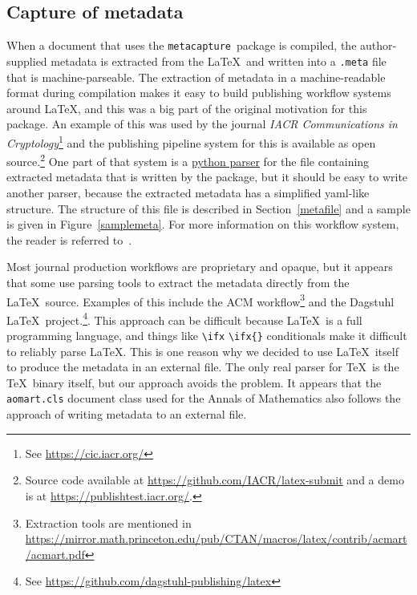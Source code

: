 \documentclass{article}
\newcommand{\pkgname}{\texttt{metacapture}}
\newcommand{\cmd}[2][]{%
  \def\FirstArg{#1}%
  \ifx\FirstArg\empty%
    \texttt{\textbackslash{}#2}%
  \else%
    \texttt{\textbackslash{}#2\{#1\}}%
  \fi
}
\begin{document}
\subsection{Capture of metadata}
When a document that uses the \pkgname\ package is compiled, the
author-supplied metadata is extracted from the \LaTeX\ and written
into a \texttt{.meta} file that is machine-parseable. The extraction
of metadata in a machine-readable format during compilation makes it
easy to build publishing workflow systems around \LaTeX, and this was
a big part of the original motivation for this package. An example of
this was used by the journal {\em IACR Communications in
Cryptology}\footnote{See \url{https://cic.iacr.org/}} and the publishing
pipeline system for this is available as open source.\footnote{Source code available
at \url{https://github.com/IACR/latex-submit} and a demo is
at \url{https://publishtest.iacr.org/}.} One part of that system is
a \href{https://github.com/IACR/latex/tree/main/iacrcc/parser}{python
parser} for the file containing extracted metadata that is written by
the package, but it should be easy to write another parser, because
the extracted metadata has a simplified yaml-like structure. The
structure of this file is described in Section~\ref{metafile} and a
sample is given in Figure~\ref{samplemeta}. For more information on
this workflow system, the reader is referred to~\cite{loweringthecost}.

Most journal production workflows are proprietary and opaque, but it
appears that some use parsing tools to extract the metadata directly
from the \LaTeX\ source. Examples of this include the ACM
workflow\footnote{Extraction tools are mentioned in
\url{https://mirror.math.princeton.edu/pub/CTAN/macros/latex/contrib/acmart/acmart.pdf}}
and the Dagstuhl \LaTeX\
project.\footnote{See \url{https://github.com/dagstuhl-publishing/latex}}. This
approach can be difficult because \LaTeX\ is a full programming
language, and things like \cmd{ifx} conditionals make it difficult to reliably parse \LaTeX.
This is one reason why we decided to use \LaTeX\ itself to
produce the metadata in an external file. The only real parser for \TeX\ is the \TeX\ binary
itself, but our approach avoids the problem. It appears that the \texttt{aomart.cls}
document class used for the Annals of Mathematics also follows the approach
of writing metadata to an external file.
\end{document}
